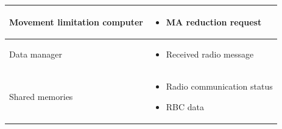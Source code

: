 \documentclass[nocc]{template/openetcs_report}
\begin{document}
\begin{longtable}{|l|l|}
					\begin{minipage}[t]{0.35\linewidth} Movement limitation computer	\end{minipage} 
				&	\begin{minipage}[t]{0.65\linewidth}
						\begin{itemize}
							\item MA reduction request
						\end{itemize}			
					\end{minipage} \\
				
				\hline	
								
					\begin{minipage}[t]{0.35\linewidth} Data manager	\end{minipage} 
				&	\begin{minipage}[t]{0.65\linewidth}
						\begin{itemize}
							\item Received radio message
						\end{itemize}			
					\end{minipage} \\
				
				\hline	
												
				\hline					
					\begin{minipage}[t]{0.35\linewidth} Shared memories	\end{minipage} 
				&	\begin{minipage}[t]{0.65\linewidth}
						\begin{itemize}
							\item Radio communication status
							\item RBC data
						\end{itemize}				
					\end{minipage} \\
				
				\hline	
			\end{longtable}
\newpage				
\end{document}
